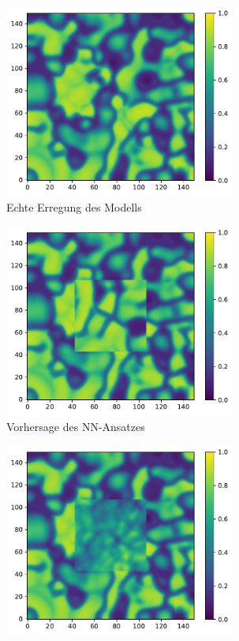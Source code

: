 \begin{appendices}
\begin{figure}[h]
	\centering
	\begin{subfigure}{.5\textwidth}
		\centering
		\includegraphics[height=2.5in]{figures/results/inner_cross_prediction/mitchell_v_inner_original.pdf}
		\setcapmargin[1cm]{0.5cm}
		\caption{Echte Erregung des Modells}
	\end{subfigure}%
	\begin{subfigure}{.5\textwidth}
		\centering
		\includegraphics[height=2.5in]{figures/results/inner_cross_prediction/mitchell_v_inner_nn.pdf}
		\setcapmargin[1cm]{0.5cm}
  		\caption{Vorhersage des \textsc{NN}-Ansatzes}
	\end{subfigure}
	\begin{subfigure}{.5\textwidth}
		\centering
		\includegraphics[height=2.5in]{figures/results/inner_cross_prediction/mitchell_v_inner_rbf.pdf}

\end{subfigure}
\end{figure}
\end{appendices}
